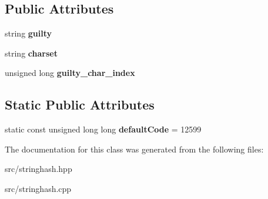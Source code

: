 \subsection*{Public Attributes}
\begin{DoxyCompactItemize}
\item 
\mbox{\label{classDataJuggler_1_1StringHashOutOfSetEx_aa5c313e22f91e09002e3bb3f8f866db9}} 
string {\bfseries guilty}
\item 
\mbox{\label{classDataJuggler_1_1StringHashOutOfSetEx_ac99fb53369b60fa66bc0d26b7ef6bcf5}} 
string {\bfseries charset}
\item 
\mbox{\label{classDataJuggler_1_1StringHashOutOfSetEx_a4ab18c72c3690d809bcc1d9d69589348}} 
unsigned long {\bfseries guilty\+\_\+char\+\_\+index}
\end{DoxyCompactItemize}
\subsection*{Static Public Attributes}
\begin{DoxyCompactItemize}
\item 
\mbox{\label{classDataJuggler_1_1StringHashOutOfSetEx_a719d3f8abab813f822c91804e0f76030}} 
static const unsigned long long {\bfseries default\+Code} = 12599
\end{DoxyCompactItemize}


The documentation for this class was generated from the following files\+:\begin{DoxyCompactItemize}
\item 
src/stringhash.\+hpp\item 
src/stringhash.\+cpp\end{DoxyCompactItemize}
